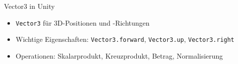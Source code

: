 \begin{definition}{Vector3 in Unity}
    \begin{itemize}
        \item \texttt{Vector3} für 3D-Positionen und -Richtungen
        \item Wichtige Eigenschaften: \texttt{Vector3.forward}, \texttt{Vector3.up}, \texttt{Vector3.right}
        \item Operationen: Skalarprodukt, Kreuzprodukt, Betrag, Normalisierung
    \end{itemize}
\end{definition}




